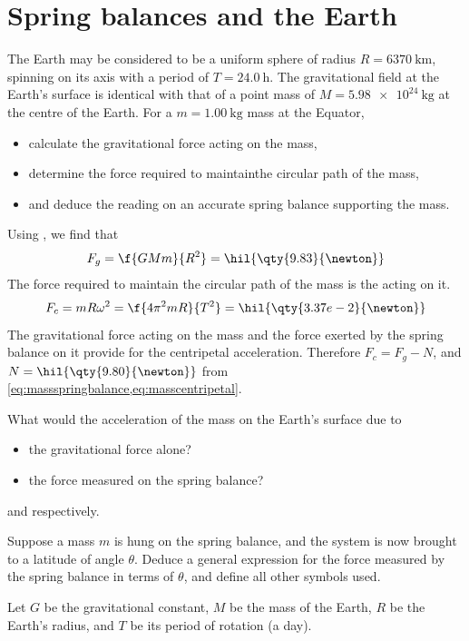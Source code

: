 \section{Spring balances and the Earth}
\begin{problem}
The Earth may be considered to be a uniform sphere of radius \(R = \qty{6370}{\km}\),
spinning on its axis with a period of \(T = \qty{24.0}{\hour}\). The gravitational field
at the Earth's surface is identical with that of a point mass of \(M = \qty{5.98e24}{\kilogram}\)
at the centre of the Earth. For a \(m = \qty{1.00}{\kilogram}\) mass at the Equator,
\begin{itemize}
	\item calculate the gravitational force acting on the mass,
	\item determine the force required to maintainthe circular path of the mass,
	\item and deduce the reading on an accurate spring balance supporting the mass.
\end{itemize}
\end{problem}
Using , we find that
\begin{equation}
	\label{eq:massspringbalance}
	F_g = \f{GMm}{R^2} = \hil{\qty{9.83}{\newton}}
\end{equation}
The force required to maintain the circular path of the mass is the  acting on it.
\begin{equation}
	\label{eq:masscentripetal}
	F_c = mR\omega^2 = \f{4\pi^2mR}{T^2} = \hil{\qty{3.37e-2}{\newton}}
\end{equation}
The gravitational force acting on the mass and the force exerted by the spring balance on it
provide for the centripetal acceleration. Therefore \(F_c = F_g - N\), and \(N = \hil{\qty{9.80}{\newton}}\) from \cref{eq:massspringbalance,eq:masscentripetal}.

\begin{problem}
What would the acceleration of the mass on the Earth's surface due to
\begin{itemize}
	\item the gravitational force alone?
	\item the force measured on the spring balance?
\end{itemize}
\end{problem}
 and  respectively.

\begin{problem}
Suppose a mass \(m\) is hung on the spring balance, and the system is now
brought to a latitude of angle \(\theta\). Deduce a general expression for the force measured
by the spring balance in terms of \(\theta\), and define all other symbols used.
\end{problem}
Let \(G\) be the gravitational constant, \(M\) be the mass of the Earth,
\(R\) be the Earth's radius, and \(T\) be its period of rotation (a day).

